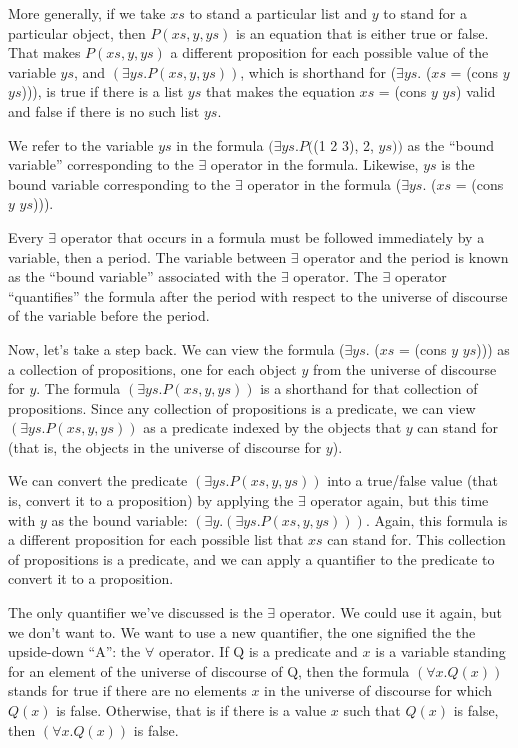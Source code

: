 More generally, if we take $xs$ to stand a particular list
and $y$ to stand for a particular object, then
$P(xs, y, ys)$ is an equation that is either true or false.
That makes $P(xs, y, ys)$ a different proposition 
for each possible value of the variable $ys$,
and $(\exists ys.P(xs, y, ys))$, which is
shorthand for 
($\exists ys.$ ($xs$ = (cons $y$ $ys$))),
is true if there is a list $ys$ that makes the
equation $xs$ = (cons $y$ $ys$) valid and false if there is no such list $ys$.

We refer to the variable $ys$ in the formula $(\exists ys.P($(1 2 3), 2, $ys))$
as the ``bound variable'' corresponding to the $\exists$ operator in the formula.
Likewise, $ys$ is the bound variable corresponding 
to the $\exists$ operator in the formula
($\exists ys.$ ($xs$ = (cons $y$ $ys$))).

Every $\exists$ operator that occurs in a formula must be 
followed immediately by a variable, then a period.
The variable between $\exists$ operator and the period is known as the 
\label{bound-var-def} 
``bound variable''
associated with the $\exists$ operator.
\label{quantify-def} 
The $\exists$ operator ``quantifies'' the formula after the period
with respect to the universe of discourse of the variable before the period.

Now, let's take a step back.
We can view the formula
($\exists ys.$ ($xs$ = (cons $y$ $ys$)))
as a collection of propositions,
one for each object $y$ from the universe of discourse for $y$.
The formula
$(\exists ys.P(xs, y, ys))$ is a shorthand for that
collection of propositions.
Since any collection of propositions is a predicate,
we can view $(\exists ys.P(xs, y, ys))$ as a predicate indexed
by the objects that $y$ can stand for 
(that is, the objects in the universe of discourse for $y$).

We can convert the predicate $(\exists ys.P(xs, y, ys))$
into a true/false value (that is, convert it to a proposition)
by applying the $\exists$ operator again,
but this time with $y$ as the bound variable:
$(\exists y.(\exists ys.P(xs, y, ys)))$.
Again, this formula is a different proposition for each
possible list that $xs$ can stand for.
This collection of propositions is a predicate,
and we can apply a quantifier to the predicate to convert it to a proposition.

The only quantifier we've discussed is the $\exists$ operator.
We could use it again, but we don't want to.
We want to use a new quantifier, the one signified
the the upside-down ``A'': the $\forall$ operator.
\label{forall-def}
If Q is a predicate and $x$ is a variable standing for
an element of the universe of discourse of Q,
then the formula $(\forall x.Q(x))$ stands for true
if there are no elements $x$ in the universe of discourse
for which $Q(x)$ is false. 
Otherwise, that is if there is a value $x$ such that $Q(x)$ is false,
then $(\forall x.Q(x))$ is false.

